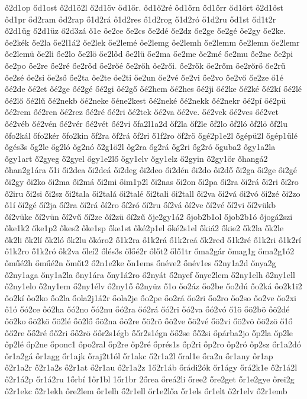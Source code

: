 {ő2d1op
őd1ost
ő2d1ö2l
ő2d1öv
őd1őr.
őd1ő2ré
őd1őrn
őd1őrr
őd1őrt
ő2d1őst
őd1pr
őd2ram
őd2rap
ő1d2rá
ő1d2res
ő1d2rog
ő1d2ró
ő1d2ru
őd1st
őd1t2r
ő2d1üg
ő2d1üz
ő2d3zá
ő1e
őe2ce
őe2cs
őe2dé
őe2dz
őe2ge
őe2gé
őe2gy
őe2ke.
őe2kék
őe2la
őe2l1á2
őe2lek
őe2lemé
őe2lemg
őe2lemh
őe2lemm
őe2lemn
őe2lemr
őe2lemü
őe2li
őe2lo
őe2lö
őe2lőd
őe2lü
őe2ma
őe2me
őe2mé
őe2mu
őe2ne
őe2pi
őe2po
őe2re
őe2ré
őe2rőd
őe2rőé
őe2rőh
őe2rői.
őe2rők
őe2rőm
őe2rőrő
őe2rü
őe2sé
őe2si
őe2ső
őe2ta
őe2te
őe2ti
őe2un
őe2vé
őe2vi
őe2vo
őe2vő
őe2ze
ő1é
őé2de
őé2et
őé2ge
őé2gé
őé2gi
őé2gő
őé2hem
őé2hes
őé2ji
őé2ke
őé2ké
őé2kí
őé2lé
őé2lő
őé2lű
őé2nekb
őé2neke
őéne2kest
őé2neké
őé2nekk
őé2nekr
őé2pí
őé2pü
őé2rem
őé2ren
őé2rez
őé2ré
őé2ri
őé2tek
őé2va
őé2ve.
őé2vek
őé2ves
őé2vet
őé2véb
őé2vén
őé2vér
őé2vét
őé2vi
őfa2l1a2d
őf2la
őf2le
őf2lo
őf2ló
őf2lö
őf2lu
őfo2kál
őfo2kér
őfo2kin
őf2ra
őf2rá
őf2ri
ő1f2ro
őf2rö
őgé2p1e2l
őgépü2l
őgép1ülé
őgés3s
őg2le
őg2ló
őg2nó
ő2g1ö2l
őg2ra
őg2rá
őg2ri
őg2ró
őguba2
őgy1a2la
őgy1art
ő2gyeg
ő2gyel
őgy1e2lő
őgy1elv
őgy1elz
ő2gyin
ő2gy1ör
őhangá2
őhan2g1ára
ő1i
ői2dea
ői2deá
ői2deg
ői2deo
ői2dén
ői2do
ői2dő
ői2ga
ői2ge
ői2gé
ői2gy
ői2ko
ői2ma
ői2má
ői2mi
őim1p2l
ői2nas
ői2on
ői2pa
ői2ra
ői2rá
ői2ri
ői2ro
ő2iru
ői2si
ői2sz
ői2tala
ői2talá
ői2talé
ői2tali
ői2tall
ői2va
ői2vá
ői2vó
ői2zé
ői2zo
ő1í
őí2gé
őí2ja
őí2ra
őí2rá
őí2ro
őí2ró
őí2ru
őí2vá
őí2ve
őí2vé
őí2vi
őí2vükb
őí2vüke
őí2vün
őí2vű
őí2ze
őí2zü
őí2zű
ője2gy1á2
őjob2b1ol
őjob2b1ó
őjogá2szi
őke1k2
őke1p2
őkes2
őke1sp
őke1st
őké2p1el
őké2s1el
őkiá2
őkie2
ők2la
ők2le
ők2li
ők2lí
ők2ló
ők2lu
őkóro2
ő1k2ra
ő1k2rá
ő1k2reá
ők2red
ő1k2ré
ő1k2ri
ő1k2rí
ő1k2ro
ő1k2ró
ők2va
őleí2
őlés3s
őlőé2r
őlőt2
őlő1tr
őma2gár
őmag1g
őma2g1ó2
őműé2h
őműé2n
őműt2
ő2n1e2ke
őn1ems
őnéve2
őnév1es
ő2ny1a2d
őnya2g
ő2ny1aga
őny1a2la
őny1ára
őny1á2ro
ő2nyát
ő2nyef
őnye2lem
ő2ny1elh
ő2ny1ell
ő2ny1elo
ő2ny1em
ő2ny1élv
ő2ny1ő
ő2nyüz
ő1o
őo2áz
őo2be
őo2dú
őo2ká
őo2k1i2
őo2kí
őo2ko
őo2la
őola2j1á2r
őola2je
őo2pe
őo2rá
őo2ri
őo2ro
őo2so
őo2ve
őo2xi
ő1ó
őó2ce
őó2ha
őó2no
őó2nu
őó2ra
őó2rá
őó2ri
őó2va
őó2vó
ő1ö
őö2bö
őö2dé
őö2ko
őö2kö
őö2lé
őö2lő
őö2na
őö2re
őö2rö
őö2ve
őö2vé
őö2vi
őö2vö
őö2zö
ő1ő
őő2re
őő2ré
őő2ri
őő2rö
őőr2s1égb
őőr2s1égn
őő2se
őő2si
őpárba2jo
őp2la
őp2le
őp2lé
őp2ne
őponc1
őpo2ral
őp2re
őp2ré
őprés1s
őp2ri
őp2ro
őp2ró
őp2sz
őr1a2dó
őr1a2gá
őr1agg
őr1ajk
őraj2t1ól
őr1akc
ő2r1a2l
őral1e
őra2n
őr1any
őr1ap
ő2r1a2r
ő2r1a2s
ő2r1at
ő2r1au
ő2r1a2z
1ő2r1áb
őrádi2ók
őr1ágy
őrá2k1e
ő2r1á2l
ő2r1á2p
őr1á2ru
1őrbí
1őr1bl
1őr1br
2őrea
őreá2li
őree2
őre2get
őr1e2gye
őrei2g
ő2r1ekc
ő2r1ekh
őre2lem
őr1elh
ő2r1ell
őr1e2lőa
őr1els
őr1elt
ő2r1elv
ő2r1emb
}

